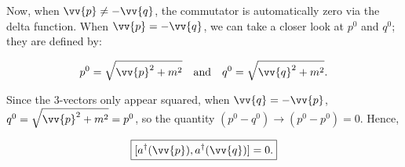 Now, when $\vv{p} \neq -\vv{q}$, the commutator is automatically zero via the delta function. When $\vv{p} = -\vv{q}$, we can take a closer look at $p^0$ and $q^0$; they are defined by:

\begin{equation*}
    p^0 = \sqrt{\vv{p}^2 + m^2} \quad \mathrm{and} \quad q^0 = \sqrt{\vv{q}^2 + m^2}.
\end{equation*}

Since the 3-vectors only appear squared, when $\vv{q} = -\vv{p}$, $q^0 = \sqrt{\vv{p}^2 + m^2} = p^0$, so the quantity $(p^0 - q^0) \rightarrow (p^0 - p^0) = 0$. Hence,

\begin{equation*}
    \boxed{[a^{\dagger}(\vv{p}),a^{\dagger}(\vv{q})] = 0.}
\end{equation*}
